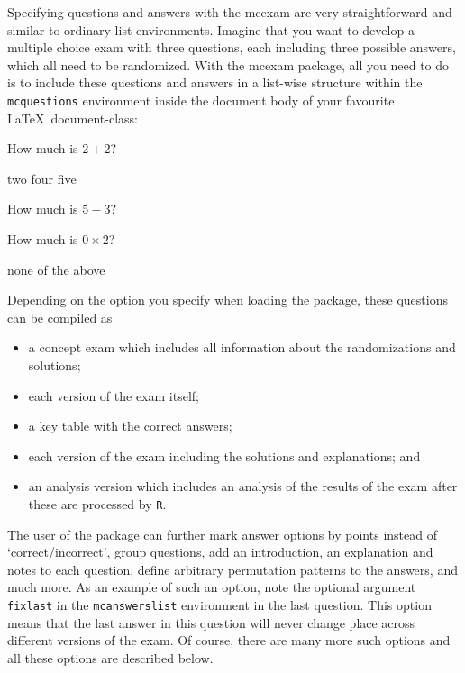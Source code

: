 \documentclass{article}
\begin{document}
Specifying questions and answers with the \textsf{mcexam} are very straightforward and similar to ordinary list environments. Imagine that you want to develop a multiple choice exam with three questions, each including three possible answers, which all need to be randomized. With the \textsf{mcexam} package, all you need to do is to include these questions and answers in a list-wise structure within the \verb+mcquestions+ environment inside the document body of your favourite \LaTeX\ document-class:
\begin{code}
\begin{mcquestions}

\question How much is $2+2$? 

          \begin{mcanswerslist}
          \answer two
          \answer[correct] four
          \answer five
          \end{mcanswerslist} 
          
\question How much is $5-3$? 

          \begin{mcanswerslist}
          \end{mcanswerslist}
          
\question How much is $0 \times 2$? 

          \begin{mcanswerslist}[fixlast]
          \answer[correct] none of the above
          \end{mcanswerslist}
          
\end{mcquestions}
\end{code}

Depending on the option you specify when loading the package, these questions can be compiled as 
\begin{itemize}
 \item a concept exam which includes all information about the randomizations and solutions;
 \item each version of the exam itself;
 \item a key table with the correct answers;
 \item each version of the exam including the solutions and explanations; and 
 \item an analysis version which includes an analysis of the results of the exam after these are processed by \verb+R+.
\end{itemize}
The user of the package can further mark answer options by points instead of `correct/incorrect', group questions, add an introduction, an explanation and notes to each question, define arbitrary permutation patterns to the answers, and much more. As an example of such an option, note the optional argument \verb$fixlast$ in the \verb$mcanswerslist$ environment in the last question. This option means that the last answer in this question will never change place across different versions of the exam. Of course, there are many more such options and all these options are described below.  
\end{document}
